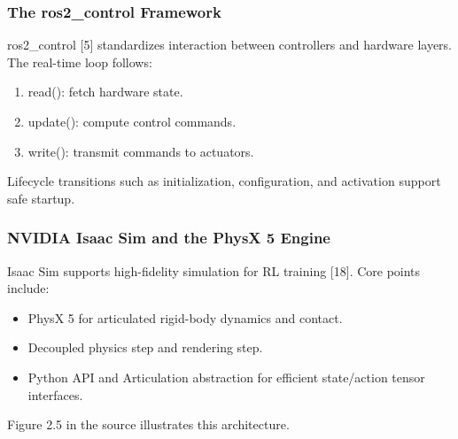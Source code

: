 \subsubsection*{The ros2\_control Framework}

ros2\_control [5] standardizes interaction between controllers and hardware layers. The real-time loop follows:
\begin{enumerate}
    \item read(): fetch hardware state.
    \item update(): compute control commands.
    \item write(): transmit commands to actuators.
\end{enumerate}

Lifecycle transitions such as initialization, configuration, and activation support safe startup.

\subsubsection*{NVIDIA Isaac Sim and the PhysX 5 Engine}

Isaac Sim supports high-fidelity simulation for RL training [18]. Core points include:
\begin{itemize}
    \item PhysX 5 for articulated rigid-body dynamics and contact.
    \item Decoupled physics step and rendering step.
    \item Python API and Articulation abstraction for efficient state/action tensor interfaces.
\end{itemize}

Figure 2.5 in the source illustrates this architecture.
